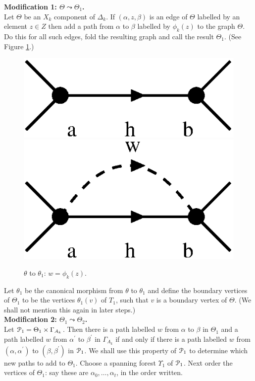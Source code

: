 \documentclass[a4paper,12pt]{article}
\renewcommand{\a}{\alpha }
\renewcommand{\b}{\beta }
\newcommand{\G}{\Gamma }
\newcommand{\D}{\Delta }
\newcommand{\T}{\Theta }
\newcommand{\U}{\Upsilon }
\newcommand{\cP}{{\cal{P}}}
\numberwithin{equation}{section}
\numberwithin{figure}{section}
\begin{document}
\noindent\textbf{Modification 1: $\T\leadsto \T_1$.}\\
 Let $\T$ be an $X_k$ component of $\D_k$. 
If $(\a,z,\b)$ is an edge of
$\T$ labelled by an element $z\in Z$ then add a path from $\a$ to
$\b$ labelled by $\phi_k(z)$ to the graph $\T$. Do this for all such edges, fold
the resulting graph 
and call the result $\T_1$. (See Figure \ref{fig:alg2-1}.) 
\begin{figure}
\begin{center}
\psfrag{a}{$\a$}
\psfrag{b}{$\b$}
\subfigure%
{
\includegraphics[scale=.5]{alg2-1a.eps}
\label{fig:alg2-1a}} 
\raisebox{3ex}{$\leadsto$}
\subfigure%
{ 
\psfrag{a}{$\a$}
\psfrag{b}{$\b$}
\includegraphics[scale=.5]{alg2-1b.eps}
\label{fig:alg2-1b}}
\end{center}
\caption{$\theta$ to $\theta_1$: $w=\phi_k(z)$.}\label{fig:alg2-1}
\end{figure}
Let $\theta_1$ be the canonical
morphism from $\theta$ to $\theta_1$ and  define the boundary vertices of $\T_1$ to be
the vertices $\theta_1(v)$ of $T_1$, 
such that $v$ is a boundary vertex of $\T$. (We shall not mention this again in later
steps.)\\[1em]

\noindent\textbf{Modification 2: $\T_1\leadsto \T_2$.}\\
 Let $\cP_1=\T_1\times \G_{A_k}$. Then there is a path
 labelled $w$ from $\a$ to $\b$
in $\T_1$ and a path labelled $w$ from $\a^\prime $
to $\b^\prime$ in $\G_{A_k}$ if and only if there is a path
labelled $w$ from $(\a,\a^\prime)$ to $(\b,\b^\prime)$ in $\cP_1$.
 We shall
use this property of $\cP_1$ to determine which new paths to add  to
$\T_1$. Choose a spanning  forest $\U_1$ of  $\cP_1$. Next
 order the vertices of
$\T_1$: say these are $\a_0,\ldots, \a_t$, in the order written.
\end{document}
